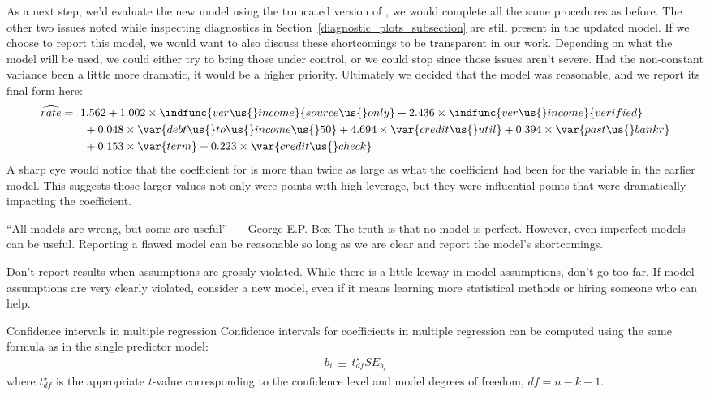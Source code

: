 As a next step, we'd evaluate the new model using
the truncated version of ,
we would complete all the same procedures as before.
The other two issues noted while inspecting diagnostics
in Section~\ref{diagnostic_plots_subsection} are still
present in the updated model.
If we choose to report this model, we would want to also
discuss these shortcomings to be transparent in our work.
Depending on what the model will be used, we could either
try to bring those under control, or we could stop since
those issues aren't severe.
Had the non-constant variance been a little more dramatic,
it would be a higher priority.
Ultimately we decided that the model was reasonable,
and we report its final form here:
\begin{align*}
\widehat{rate} &= \ 1.562
    + 1.002 \times \indfunc{ver\us{}income}{source\us{}only}
    + 2.436 \times \indfunc{ver\us{}income}{verified} \\
  &\qquad
    + 0.048 \times \var{debt\us{}to\us{}income\us{}50}
    + 4.694 \times \var{credit\us{}util}
    + 0.394 \times \var{past\us{}bankr} \\
  &\qquad
    + 0.153 \times \var{term}
    + 0.223 \times \var{credit\us{}check}
\end{align*}
A sharp eye would notice that the coefficient for
 is more than twice
as large as what the coefficient had been for the
 variable in the earlier model.
This suggests those larger values not only were points
with high leverage, but they were influential points that
were dramatically impacting the coefficient.

\begin{onebox}{``All models are wrong,
    but some are useful''~~~-George E.P. Box}
  The truth is that no model is perfect.
  However, even imperfect models can be useful.
  Reporting a flawed model can be reasonable so long
  as we are clear and report the model's shortcomings.
\end{onebox}

Don't report results when assumptions are grossly violated.
While there is a little leeway in model assumptions, don't go too far. If model assumptions are very clearly violated, consider a new model, even if it means learning more statistical methods or hiring someone who can help.

\begin{onebox}{Confidence intervals in multiple regression}
%
Confidence intervals for coefficients in multiple regression can be computed using the same formula as in the single predictor model:
\begin{align*}
b_i \ \pm\ t_{df}^{\star}SE_{b_{i}}
\end{align*}
where $t_{df}^{\star}$ is the appropriate $t$-value corresponding to the confidence level and model degrees of freedom, $df=n-k-1$.
\end{onebox}


